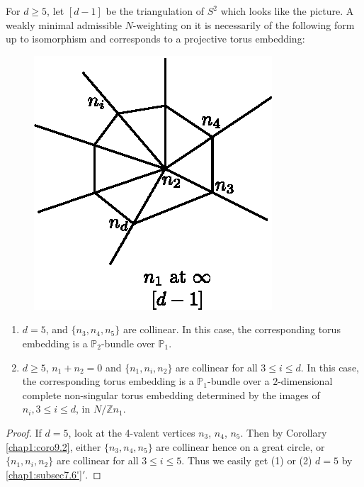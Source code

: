 \setcounter{lemma}{6}
\begin{lemma}\label{chap1:lem9.7}
For $d \geq 5$, let $[d-1]$ be the triangulation of $S^2$ which looks
like the picture. A weakly minimal admissible $N$-weighting on it is
necessarily of the following form up to isomorphism and corresponds to
a projective torus embedding: 

\begin{figure}[H]
\centering 
\includegraphics{vol58-fig/fig58-41.eps} 
\end{figure}


\begin{enumerate}[(1)]
 \item $d=5$, and $\{n_3, n_4, n_5\}$ are collinear. In this case, the
   corresponding torus embedding is a $\mathbb{P}_2$-bundle over
   $\mathbb{P}_1$. 

 \item $d \geq 5 $, $n_1 + n_2=0$ and $\{n_1, n_i, n_2 \}$ are
   collinear for all $3 \leq i \leq d $. In this case, the
   corresponding torus embedding is a $\mathbb{P}_1$-bundle over a
   $2$-dimensional complete non-singular torus embedding determined by
   the images of $n_i, 3 \leq i \leq d$, in $N/\mathbb{Z}n_1$. 
 \end{enumerate}
 \end{lemma}

 \begin{proof}
If $d = 5$, look at the 4-valent vertices $n_3$, $n_4$, $n_5$. Then by
Corollary \ref{chap1:coro9.2}, either $\{n_3, n_4, n_5\}$ are collinear hence on a
great circle, or $\{ n_1, n_i, n_2\}$ are collinear for all $3
\leqslant i \leq 5$. Thus we easily get (1) or (2) $d=5$ by
\ref{chap1:subsec7.6'}$'$. 
 \end{proof} 


